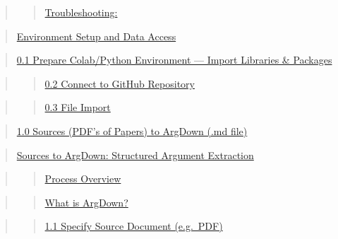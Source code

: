 \documentclass[
  11pt,
  letterpaper,
]{book}
\begin{document}
\begin{quote}
\begin{quote}
\hyperref[scrollTo=NovjnOw6bzLi]{Troubleshooting:}
\end{quote}
\end{quote}

\begin{quote}
\hyperref[scrollTo=neYYoWhbNRIJ]{Environment Setup and Data Access}
\end{quote}

\begin{quote}
\hyperref[scrollTo=GtVFO-s74vI_]{0.1 Prepare Colab/Python Environment
--- Import Libraries \& Packages}
\end{quote}

\begin{quote}
\begin{quote}
\hyperref[scrollTo=2a3VR0fLhJow]{0.2 Connect to GitHub Repository}
\end{quote}
\end{quote}

\begin{quote}
\begin{quote}
\hyperref[scrollTo=y-ix4Rp5fE9m]{0.3 File Import}
\end{quote}
\end{quote}

\begin{quote}
\hyperref[scrollTo=52XyPlte5HrU]{1.0 Sources (PDF's of Papers) to
ArgDown (.md file)}
\end{quote}

\begin{quote}
\hyperref[scrollTo=1-7O4KHfNU-e]{Sources to ArgDown: Structured Argument
Extraction}
\end{quote}

\begin{quote}
\begin{quote}
\hyperref[scrollTo=1-7O4KHfNU-e]{Process Overview}
\end{quote}
\end{quote}

\begin{quote}
\begin{quote}
\hyperref[scrollTo=1-7O4KHfNU-e]{What is ArgDown?}
\end{quote}
\end{quote}

\begin{quote}
\begin{quote}
\hyperref[scrollTo=ESKnZ_4f_a6y]{1.1 Specify Source Document (e.g.~PDF)}
\end{quote}
\end{quote}
\end{document}
